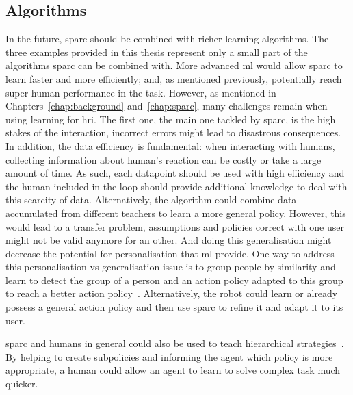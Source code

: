 \subsection{Algorithms}
In the future, \gls{sparc} should be combined with richer learning algorithms. The three examples provided in this thesis represent only a small part of the algorithms \gls{sparc} can be combined with. More advanced \gls{ml} would allow \gls{sparc} to learn faster and more efficiently; and, as mentioned previously, potentially reach super-human performance in the task. However, as mentioned in Chapters~\ref{chap:background} and~\ref{chap:sparc}, many challenges remain when using learning for \gls{hri}. The first one, the main one tackled by \gls{sparc}, is the high stakes of the interaction, incorrect errors might lead to disastrous consequences. In addition, the data efficiency is fundamental: when interacting with humans, collecting information about human's reaction can be costly or take a large amount of time. As such, each datapoint should be used with high efficiency and the human included in the loop should provide additional knowledge to deal with this scarcity of data. Alternatively, the algorithm could combine data accumulated from different teachers to learn a more general policy. However, this would lead to a transfer problem, assumptions and policies correct with one user might not be valid anymore for an other. And doing this generalisation might decrease the potential for personalisation that \gls{ml} provide. One way to address this personalisation vs generalisation issue is to group people by similarity and learn to detect the group of a person and an action policy adapted to this group to reach a better action policy~\citep{brunskill2014pac}. Alternatively, the robot could learn or already possess a general action policy and then use \gls{sparc} to refine it and adapt it to its user. 

\gls{sparc} and humans in general could also be used to teach hierarchical strategies~\citep{botvinick2012hierarchical}. By helping to create subpolicies and informing the agent which policy is more appropriate, a human could allow an agent to learn to solve complex task much quicker. %


